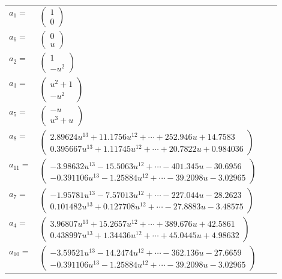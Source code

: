 \documentclass[1p]{elsarticle_modified}
\theoremstyle{definition}
\begin{document}
\begin{tabular}{m{7pt} m{180pt} m{7pt} m{180pt} }
\flushright $a_{1}=$&$\begin{pmatrix}1\\0\end{pmatrix}$ \\
\flushright $a_{6}=$&$\begin{pmatrix}0\\u\end{pmatrix}$ \\
\flushright $a_{2}=$&$\begin{pmatrix}1\\- u^2\end{pmatrix}$ \\
\flushright $a_{3}=$&$\begin{pmatrix}u^2+1\\- u^2\end{pmatrix}$ \\
\flushright $a_{5}=$&$\begin{pmatrix}- u\\u^3+u\end{pmatrix}$ \\
\flushright $a_{8}=$&$\begin{pmatrix}2.89624 u^{13}+11.1756 u^{12}+\cdots+252.946 u+14.7583\\0.395667 u^{13}+1.11745 u^{12}+\cdots+20.7822 u+0.984036\end{pmatrix}$ \\
\flushright $a_{11}=$&$\begin{pmatrix}-3.98632 u^{13}-15.5063 u^{12}+\cdots-401.345 u-30.6956\\-0.391106 u^{13}-1.25884 u^{12}+\cdots-39.2098 u-3.02965\end{pmatrix}$ \\
\flushright $a_{7}=$&$\begin{pmatrix}-1.95781 u^{13}-7.57013 u^{12}+\cdots-227.044 u-28.2623\\0.101482 u^{13}+0.127708 u^{12}+\cdots-27.8883 u-3.48575\end{pmatrix}$ \\
\flushright $a_{4}=$&$\begin{pmatrix}3.96807 u^{13}+15.2657 u^{12}+\cdots+389.676 u+42.5861\\0.438997 u^{13}+1.34436 u^{12}+\cdots+45.0445 u+4.98632\end{pmatrix}$ \\
\flushright $a_{10}=$&$\begin{pmatrix}-3.59521 u^{13}-14.2474 u^{12}+\cdots-362.136 u-27.6659\\-0.391106 u^{13}-1.25884 u^{12}+\cdots-39.2098 u-3.02965\end{pmatrix}$ \\

\end{tabular}
\end{document}
